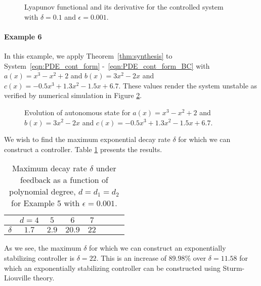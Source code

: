 \documentclass[9pt,journal,twocolumn]{IEEEtran}
\begin{document}
\begin{figure}[h!]
\centering
{}
\quad
{}
\caption{Lyapunov functional and its derivative for the controlled system with $\delta = 0.1$ and $\epsilon =0.001$.}
\label{fig:V_control}
\end{figure}


\paragraph*{Example 6} In this example, we apply Theorem~\ref{thm:synthesis} to System~\eqref{eqn:PDE_cont_form} -~\eqref{eqn:PDE_cont_form_BC} with $a(x)=x^3-x^2+2$ and $b(x)=3x^2-2x$ and $c(x)= -0.5x^3 + 1.3x^2 - 1.5x + 6.7$. These values render the system unstable as verified by numerical simulation in Figure \ref{fig:control_auto}.
\begin{figure}[h!]
\centering
{}
\quad
{}
\caption{Evolution of autonomous state for $a(x)=x^3-x^2+2$ and $b(x)=3x^2-2x$ and $c(x)= -0.5x^3 + 1.3x^2 - 1.5x + 6.7$.}
\label{fig:control_auto}
\end{figure}
We wish to find the maximum exponential decay rate $\delta$ for which we can construct a controller. Table \ref{table_synthesis_2} presents the results. 
\begin{table}[h]
\begin{center}
    \begin{tabular}{l *{7}{c}}\hline \hline
  & $d=4$ & $5$ & $6$ & $7$ \\ \hline
$\delta$ &  $1.7$ & $2.9$ & $20.9$ & $22$ \\
\end{tabular}
\end{center}
\caption{Maximum decay rate $\delta$ under feedback as a function of polynomial degree, $d=d_1=d_2$ for Example 5 with $\epsilon=0.001$.}
\label{table_synthesis_2}
\end{table}
As we see, the maximum $\delta$ for which we can construct an exponentially stabilizing controller is $\delta=22 $. This is an increase of $89.98 \%$ over $\delta=11.58$ for which an exponentially stabilizing controller can be constructed using Sturm-Liouville theory.
\end{document}
